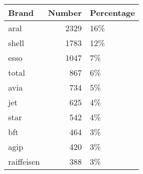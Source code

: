 \begin{table}[ht]
\centering
\begin{tabular}{lrl}
  \hline
Brand & Number & Percentage \\ 
  \hline
aral & 2329 & 16\% \\ 
  shell & 1783 & 12\% \\ 
  esso & 1047 & 7\% \\ 
  total & 867 & 6\% \\ 
  avia & 734 & 5\% \\ 
  jet & 625 & 4\% \\ 
  star & 542 & 4\% \\ 
  bft & 464 & 3\% \\ 
  agip & 420 & 3\% \\ 
  raiffeisen & 388 & 3\% \\ 
   \hline
\end{tabular}
\end{table}

